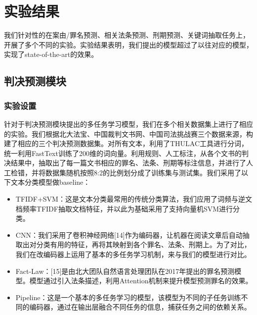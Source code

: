 \chapter{实验结果}
\label{cha:result}

我们针对性的在案由/罪名预测、相关法条预测、刑期预测、关键词抽取任务上，开展了多个不同的实验。实验结果表明，我们提出的模型超过了以往对应的模型，实现了state-of-the-art的效果。

\section{判决预测模块}
\subsection{实验设置}

针对于判决预测模块提出的多任务学习模型，我们在多个相关数据集上进行了相应的实验。我们根据北大法宝、中国裁判文书网、中国司法挑战赛三个数据来源，构建了相应的三个判决预测数据集。对所有文本，利用了THULAC工具进行分词，统一利用FastText训练了200维的词向量。利用规则、人工标注，从各个文书的判决结果中，抽取出了每一篇文书相应的罪名、法条、刑期等标注信息，并进行了人工检错，并将数据集随机按照8:2的比例划分成了训练集与测试集。我们采用了以下文本分类模型做baseline：

\begin{itemize}
	\item TFIDF+SVM：这是文本分类最常用的传统分类算法，我们应用了词频与逆文档频率TFIDF抽取文档特征，并以此为基础采用了支持向量机SVM进行分类。
	\item CNN：我们采用了卷积神经网络[14]作为编码器，让机器在阅读文章后自动抽取出对分类有用的特征，再将其映射到各个罪名、法条、刑期上。为了对比，我们在改编码器上运用了基本的多任务学习机制，来与我们的模型进行对比。
	\item Fact-Law：[15]是由北大团队自然语言处理团队在2017年提出的罪名预测模型。模型通过引入法条描述，利用Attention机制来提升模型预测罪名的效果。
	\item Pipeline：这是一个基本的多任务学习的模型，该模型为不同的子任务训练不同的编码器，通过在输出层融合不同任务的信息，捕获任务之间的依赖关系。
\end{itemize}

